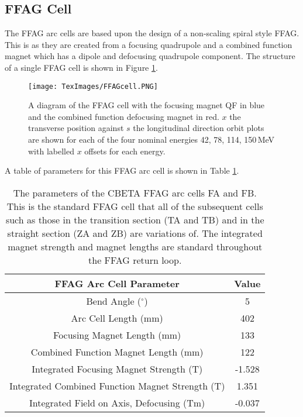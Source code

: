 \documentclass[11pt]{article}
\begin{document}
\subsection{FFAG Cell}
\label{sec:FFAGcell}

The FFAG arc cells are based upon the design of a non-scaling spiral style FFAG. This is as they are created from a focusing quadrupole and a combined function magnet which has a dipole and defocusing quadrupole component. The structure of a single FFAG cell is shown in Figure \ref{fig:FFAGcellfp}.

\begin{figure}[H]
\centering
\texttt{[image: TexImages/FFAGcell.PNG]}
\caption{\label{fig:FFAGcellfp} A diagram of the FFAG cell with the focusing magnet QF in blue and the combined function defocusing magnet in red. $x$ the transverse position against $s$ the longitudinal direction orbit plots are shown for each of the four nominal energies 42, 78, 114, 150\,MeV with labelled $x$ offsets for each energy. \cite{FAcell}}
\end{figure} 

A table of parameters for this FFAG arc cell is shown in Table \ref{tab:FFAGcell}.

\begin{table}[H]
\centering
\begin{tabular}{|c||c|}
\hline
\textbf{FFAG Arc Cell Parameter} & \textbf{Value} \\
\hline
Bend Angle ($^{\circ}$) & 5 \\
\hline
Arc Cell Length (mm) & 402 \\
\hline
Focusing Magnet Length (mm) & 133 \\
\hline
Combined Function Magnet Length (mm) & 122 \\
\hline
Integrated Focusing Magnet Strength (T) & -1.528 \\
\hline
Integrated Combined Function Magnet Strength (T) & 1.351 \\
\hline
Integrated Field on Axis, Defocusing (Tm) & -0.037 \\
\hline
\end{tabular}
\caption{\label{tab:FFAGcell} The parameters of the CBETA FFAG arc cells FA and FB. This is the standard FFAG cell that all of the subsequent cells such as those in the transition section (TA and TB) and in the straight section (ZA and ZB) are variations of. The integrated magnet strength and magnet lengths are standard throughout the FFAG return loop.}
\end{table}
\end{document}
